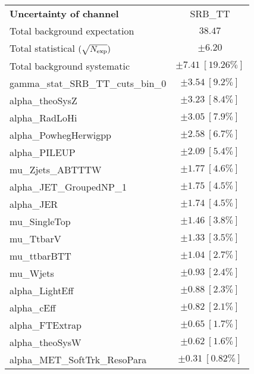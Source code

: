 
\begin{table}
\begin{center}
\setlength{\tabcolsep}{0.0pc}
\begin{tabular*}{\textwidth}{@{\extracolsep{\fill}}lc}
\noalign{\smallskip}\hline\noalign{\smallskip}
{\bf Uncertainty of channel}                                    & SRB\_TT            \\
\noalign{\smallskip}\hline\noalign{\smallskip}
Total background expectation             &  $38.47$       \\
\noalign{\smallskip}\hline\noalign{\smallskip}
Total statistical $(\sqrt{N_{\rm exp}})$              & $\pm 6.20$       \\
Total background systematic               & $\pm 7.41\ [19.26\%] $             \\
\noalign{\smallskip}\hline\noalign{\smallskip}
\noalign{\smallskip}\hline\noalign{\smallskip}
gamma\_stat\_SRB\_TT\_cuts\_bin\_0         & $\pm 3.54\ [9.2\%] $       \\
alpha\_theoSysZ         & $\pm 3.23\ [8.4\%] $       \\
alpha\_RadLoHi         & $\pm 3.05\ [7.9\%] $       \\
alpha\_PowhegHerwigpp         & $\pm 2.58\ [6.7\%] $       \\
alpha\_PILEUP         & $\pm 2.09\ [5.4\%] $       \\
mu\_Zjets\_ABTTTW         & $\pm 1.77\ [4.6\%] $       \\
alpha\_JET\_GroupedNP\_1         & $\pm 1.75\ [4.5\%] $       \\
alpha\_JER         & $\pm 1.74\ [4.5\%] $       \\
mu\_SingleTop         & $\pm 1.46\ [3.8\%] $       \\
mu\_TtbarV         & $\pm 1.33\ [3.5\%] $       \\
mu\_ttbarBTT         & $\pm 1.04\ [2.7\%] $       \\
mu\_Wjets         & $\pm 0.93\ [2.4\%] $       \\
alpha\_LightEff         & $\pm 0.88\ [2.3\%] $       \\
alpha\_cEff         & $\pm 0.82\ [2.1\%] $       \\
alpha\_FTExtrap         & $\pm 0.65\ [1.7\%] $       \\
alpha\_theoSysW         & $\pm 0.62\ [1.6\%] $       \\
alpha\_MET\_SoftTrk\_ResoPara         & $\pm 0.31\ [0.82\%] $       \\

\end{tabular*}
\end{center}
\end{table}

